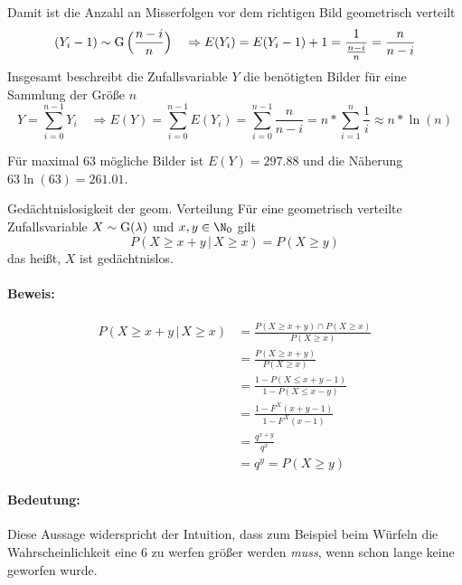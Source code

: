 Damit ist die Anzahl an Misserfolgen vor dem richtigen Bild geometrisch verteilt
\begin{equation*}
	(Y_i-1)\sim \operatorname{G}\Big(\frac{n-i}{n}\Big)\quad\Rightarrow E(Y_i)=E(Y_i-1)+1=\frac{1}{\frac{n-i}{n}}=\frac{n}{n-i}
\end{equation*}
Insgesamt beschreibt die Zufallsvariable $Y$ die benötigten Bilder für eine Sammlung der Größe $n$
\begin{equation*}
	Y=\sum_{i=0}^{n-1} Y_i\quad\Rightarrow E(Y)=\sum_{i=0}^{n-1} E(Y_i)=\sum_{i=0}^{n-1} \frac{n}{n-i}=n*\sum_{i=1}^{n}\frac1i\approx n*\ln(n)
\end{equation*}

Für maximal $63$ mögliche Bilder ist $E(Y)=297.88$ und die Näherung $63\ln(63)=261.01$.


\begin{satz}{Gedächtnislosigkeit der geom. Verteilung}
	Für eine geometrisch verteilte Zufallsvariable $X\sim \operatorname{G}(\lambda)$ und $x,y\in\N_0$ gilt
	\begin{equation*}
		P(X\geq x+y\,|\,X\geq x)=P(X\geq y)
	\end{equation*}
	das heißt, $X$ ist gedächtnislos.
\end{satz}
\paragraph{Beweis:}
\begin{align*}
	P(X\geq x+y\,|\,X\geq x)&=\frac{P(X\geq x+y)\cap P(X\geq x)}{P(X\geq x)}\\
	&=\frac{P(X\geq x+y)}{P(X\geq x)}\\
	&=\frac{1-P(X\leq x+y-1)}{1-P(X\leq x-y)}\\
	&=\frac{1-F^X(x+y-1)}{1-F^X(x-1)}\\
	&=\frac{q^{x+y}}{q^x}\\
	&=q^y=P(X\geq y)
\end{align*}

\paragraph{Bedeutung:}
Diese Aussage widerspricht der Intuition, dass zum Beispiel beim Würfeln die Wahrscheinlichkeit eine $6$ zu werfen größer werden \emph{muss}, wenn schon lange keine geworfen wurde.
